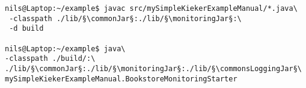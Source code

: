 \begin{lstlisting}
nils@Laptop:~/example$ javac src/mySimpleKiekerExampleManual/*.java\
 -classpath ./lib/§\commonJar§:./lib/§\monitoringJar§:\
 -d build

nils@Laptop:~/example$ java\
-classpath ./build/:\
./lib/§\commonJar§:./lib/§\monitoringJar§:./lib/§\commonsLoggingJar§\
mySimpleKiekerExampleManual.BookstoreMonitoringStarter 
\end{lstlisting}
